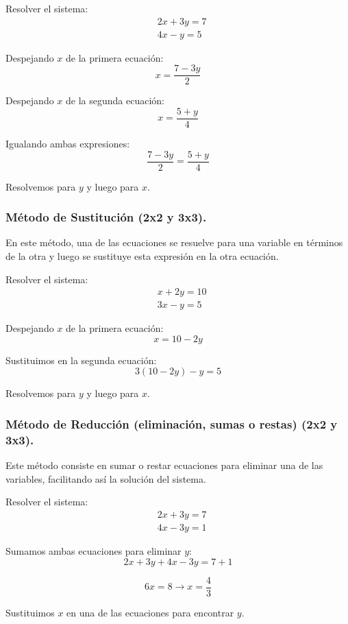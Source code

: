 \begin{example}
Resolver el sistema:
\[
\begin{aligned}
&2x + 3y = 7 \\
&4x - y = 5
\end{aligned}
\]

Despejando \(x\) de la primera ecuación:
\[
x = \frac{7 - 3y}{2}
\]

Despejando \(x\) de la segunda ecuación:
\[
x = \frac{5 + y}{4}
\]

Igualando ambas expresiones:
\[
\frac{7 - 3y}{2} = \frac{5 + y}{4}
\]

Resolvemos para \(y\) y luego para \(x\).
\end{example}

\subsubsection{Método de Sustitución (2x2 y 3x3).}
En este método, una de las ecuaciones se resuelve para una variable en términos de la otra y luego se sustituye esta expresión en la otra ecuación.

\begin{example}
Resolver el sistema:
\[
\begin{aligned}
&x + 2y = 10 \\
&3x - y = 5
\end{aligned}
\]

Despejando \(x\) de la primera ecuación:
\[
x = 10 - 2y
\]

Sustituimos en la segunda ecuación:
\[
3(10 - 2y) - y = 5
\]

Resolvemos para \(y\) y luego para \(x\).
\end{example}

\subsubsection{Método de Reducción (eliminación, sumas o restas) (2x2 y 3x3).}
Este método consiste en sumar o restar ecuaciones para eliminar una de las variables, facilitando así la solución del sistema.

\begin{example}
Resolver el sistema:
\[
\begin{aligned}
&2x + 3y = 7 \\
&4x - 3y = 1
\end{aligned}
\]

Sumamos ambas ecuaciones para eliminar \(y\):
\[
2x + 3y + 4x - 3y = 7 + 1
\]

\[
6x = 8 \rightarrow x = \frac{4}{3}
\]

Sustituimos \(x\) en una de las ecuaciones para encontrar \(y\).
\end{example}

